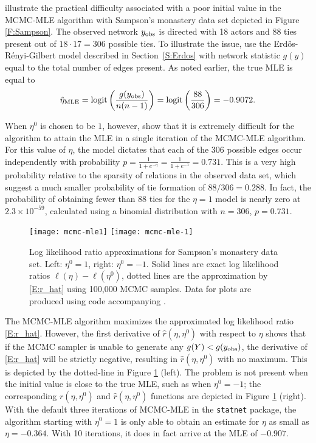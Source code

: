 \citet{ergm} illustrate the practical difficulty associated with a poor initial 
value in the MCMC-MLE algorithm with Sampson's monastery data set depicted in 
Figure \ref{F:Sampson}.  The 
observed network $y_{\text{obs}}$ is directed with 18 actors and 88 ties present out of $18 \cdot 17=306$ possible 
ties.  To illustrate the issue, \citeauthor{ergm} use the Erd\H{o}s-R\'{e}nyi-Gilbert model 
described in Section~\ref{S:Erdos} with network statistic $g(y)$ equal to the total number of 
edges present.  As noted earlier, the true MLE is equal to 
\begin{align*}
	\hat{\eta}_{\textrm{MLE}} = \operatorname{logit}\left( \frac{g(y_{\text{obs}})}{n(n-1)}\right) = \operatorname{logit} \left( \frac{88}{306}\right ) = -0.9072.
\end{align*}
  
When $\eta^0$ is chosen to be $1$, however, \citeauthor{ergm} show that it is
extremely difficult for the algorithm to attain the MLE in a single iteration of 
the MCMC-MLE algorithm.  
For this value of $\eta$, the model dictates that each of the 306 possible edges occur independently with probability $p = \frac{1}{1+e^{-\eta}} = \frac{1}{1+e^{-1}} = 0.731$.   
This is a very high probability relative to the sparsity of relations in the observed data 
set, which suggest a much smaller probability of tie formation of $88/306= 0.288$.  
In fact, the probability of obtaining fewer than 88 ties for the $\eta=1$ model is nearly zero at $2.3 \times 10^{-59}$, calculated using a binomial distribution with $n=306$, $p =0.731$.  

\begin{figure}[h]  
\begin{center} 
{\texttt{[image: mcmc-mle1]}}
{\texttt{[image: mcmc-mle-1]}}
\end{center} 
\caption[Log likelihood ratio approximations for Sampson's monastery data set]{Log likelihood ratio approximations for Sampson's monastery data set.  Left: $\eta^0 = 1$, right: $\eta^0 = -1$. Solid lines are exact log likelihood ratios $\ell(\eta) - \ell(\eta^0)$, dotted lines are the 
approximation by \eqref{E:r_hat} using 100,000 MCMC samples.  Data for plots are produced using code accompanying \citet{Hummel}.} 
\label{F:MCMC-MLE}
\end{figure} 

The MCMC-MLE algorithm maximizes the approximated log 
likelihood ratio \eqref{E:r_hat}.  However, the first derivative of $\hat{r}(\eta,\eta^0)$ with respect
to $\eta$ shows that if the MCMC sampler is unable to generate any $g(Y)< g(y_{\text{obs}})$, 
the derivative of 
\eqref{E:r_hat} will be strictly negative, resulting in $\hat{r}(\eta,\eta^0)$ with no
maximum.  This is depicted by the dotted-line in Figure \ref{F:MCMC-MLE} (left).  
The problem is not present when the initial value is close to the true MLE, such as 
when $\eta^0 = -1$; the corresponding $r(\eta,\eta^0)$ and $\hat{r}(\eta,\eta^0)$ 
functions are depicted in Figure \ref{F:MCMC-MLE} (right).  With the default three 
iterations of MCMC-MLE in the \texttt{statnet} package, the algorithm 
starting with $\eta^0 = 1$ is only able to obtain an estimate for $\eta$ as 
small as $\eta = -0.364$.  With 10 iterations, it does in fact 
arrive at the MLE of $-0.907$.

